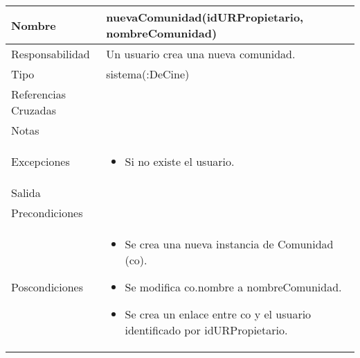 \documentclass{article}
\begin{document}
\begin{table}[h]
\begin{tabular}{|l|l|l|l|l|l|}
\hline
\multicolumn{2}{|p{3cm}|}{Nombre} & \multicolumn{3}{p{10cm}|}{\textbf{nuevaComunidad(idURPropietario, nombreComunidad)}}\\
\hline
\multicolumn{2}{|p{3cm}|}{Responsabilidad} & \multicolumn{4}{p{10cm}|}{Un usuario crea una nueva comunidad.} \\
\hline
\multicolumn{2}{|p{3cm}|}{Tipo} & \multicolumn{4}{p{10cm}|}{sistema(:DeCine)} \\
\hline
\multicolumn{2}{|p{3cm}|}{Referencias Cruzadas} & \multicolumn{4}{p{10cm}|}{} \\
\hline
\multicolumn{2}{|p{3cm}|}{Notas} & \multicolumn{4}{p{10cm}|}{} \\
\hline
\multicolumn{2}{|p{3cm}|}{Excepciones} & \multicolumn{4}{p{10cm}|}{\begin{itemize}
\item Si no existe el usuario.
\end{itemize}} \\
\hline
\multicolumn{2}{|p{3cm}|}{Salida} & \multicolumn{4}{p{10cm}|}{} \\
\hline
\multicolumn{2}{|p{3cm}|}{Precondiciones} & \multicolumn{4}{p{10cm}|}{} \\
\hline
\multicolumn{2}{|p{3cm}|}{Poscondiciones} & \multicolumn{4}{p{10cm}|}{\begin{itemize}
\item Se crea una nueva instancia de Comunidad (co).
\item Se modifica co.nombre a nombreComunidad.
\item Se crea un enlace entre co y el usuario identificado por idURPropietario.
\end{itemize}}\\
\hline
\end{tabular}
\end{table}
\end{document}
